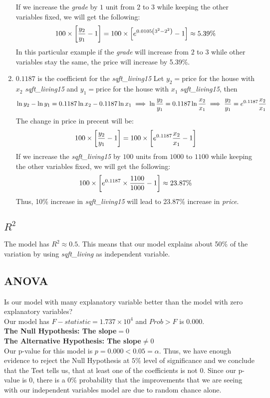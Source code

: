 \documentclass[12pt]{article}
\begin{document}
\begin{enumerate}
If we increase the {\it grade} by $1$ unit from $2$ to $3$ while keeping the other variables fixed, we will get the following:
$$
\large 
100 \times \left[\frac{y_2}{y_1} -1  \right] = 100 \times \left[ e^{0.0105\left( 3^{2} - 2^{2}\right)} - 1 \right]\approx 5.39\%
$$
In this particular example if the {\it grade} will increase from $2$ to $3$ while other variables stay the same, the price will increase by 5.39\%.
 \item $0.1187$ is the coefficient for the {\it sqft\_living15}
Let $y_2 = \text{price}$ for the house with $x_2$ {\it sqft\_living15} and $y_1 = \text{price}$ for the house with $x_1$ {\it sqft\_living15}, then 
$$
\large
\ln y_2 - \ln y_1 = 0.1187 \ln x_2 - 0.1187 \ln x_1 \implies \ln \frac{y_2}{y_1} = 0.1187 \ln \frac{x_2}{x_1} \implies \frac{y_2}{y_1} = e^{0.1187}\frac{x_2}{x_1}
$$
The change in price in precent will be:
$$
\large
100 \times \left[\frac{y_2}{y_1} - 1 \right]= 100 \times \left[ e^{0.1187}\frac{x_2}{x_1} - 1 \right]
$$
If we increase the {\it sqft\_living15} by $100$ units from $1000$ to $1100$ while keeping the other variables fixed, we will get the following:
$$
\large
100 \times \left[ e^{0.1187}\times \frac{1100}{1000} - 1 \right] \approx 23.87\%
$$
Thus, 10\% increase in {\it sqft\_living15} will lead to 23.87\% increase in {\it price}.
 \end{enumerate}
\subsection*{\textbf{\(R^2 \)}}
The model has \(R^2\approx 0.5\).  This means that our model explains about 50\% of the variation by using {\it sqft\_living} as independent variable.
\subsection*{ANOVA}
Is our model with many explanatory variable better than the model with zero explanatory variables?\\
Our model has \(F-statistic = 1.737\times 10^4\)  and \(Prob > F\) is \(0.000\).\\
\textbf{The Null Hypothesis:   The slope\(=0\)\\
The Alternative Hypothesis: The slope\(\ne 0\)\\
}
Our p-value for this model is \(p=0.000 < 0.05 = \alpha\). Thus, we have enough evidence to reject the Null Hypothesis at $5\%$ level of significance and we conclude that the Test  tells us, that at least one of the coefficients is not $0$. Since our p-value is $0$, there is a $0\%$ probability that the improvements that we are seeing with our independent variables model are due to random chance alone.\textbf{}
\end{document}
